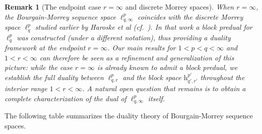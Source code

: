 \documentclass[preprint,12pt]{elsarticle}
\newtheorem{remark}[theorem]{Remark}
\begin{document}
\begin{remark}[The endpoint case $r=\infty$ and discrete Morrey spaces]
When $r=\infty$, the Bourgain-Morrey sequence space $\ell_{q,\infty}^{p}$ 
coincides with the discrete Morrey space $\ell_q^p$ studied earlier by Haroske et al (cf.~\cite{MorreySeq2020}). 
In that work a block predual for $\ell_q^p$ was constructed (under a different notation), 
thus providing a duality framework at the endpoint $r=\infty$. 
Our main results for $1<p< q<\infty$ and $1<r<\infty$ can therefore be seen 
as a refinement and generalization of this picture: 
while the case $r=\infty$ is already known to admit a block predual, 
we establish the full duality between $\ell_{q,r}^p$ and the block space 
$\mathrm{h}_{q',r'}^{p'}$ throughout the interior range $1<r<\infty$. 
A natural open question that remains is to obtain a complete characterization of the dual 
of $\ell_{q,\infty}^p$ itself.
\end{remark}
The following table summarizes the duality theory of Bourgain-Morrey sequence spaces.
\end{document}
